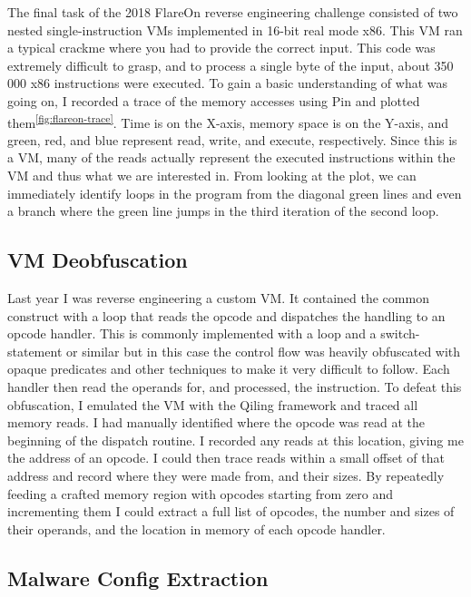 \documentclass[twocolumn]{article}
\begin{document}
The final task of the 2018 FlareOn reverse engineering challenge consisted of two nested single-instruction VMs implemented in 16-bit real mode x86. This VM ran a typical crackme where you had to provide the correct input. This code was extremely difficult to grasp, and to process a single byte of the input, about 350 000 x86 instructions were executed. To gain a basic understanding of what was going on, I recorded a trace of the memory accesses using Pin and plotted them\textsuperscript{\ref{fig:flareon-trace}}. Time is on the X-axis, memory space is on the Y-axis, and green, red, and blue represent read, write, and execute, respectively. Since this is a VM, many of the reads actually represent the executed instructions within the VM and thus what we are interested in. From looking at the plot, we can immediately identify loops in the program from the diagonal green lines and even a branch where the green line jumps in the third iteration of the second loop.

\vspace*{-0.5\baselineskip}
\subsection*{VM Deobfuscation}

Last year I was reverse engineering a custom VM. It contained the common construct with a loop that reads the opcode and dispatches the handling to an opcode handler. This is commonly implemented with a loop and a switch-statement or similar but in this case the control flow was heavily obfuscated with opaque predicates and other techniques to make it very difficult to follow. Each handler then read the operands for, and processed, the instruction. To defeat this obfuscation, I emulated the VM with the Qiling framework and traced all memory reads. I had manually identified where the opcode was read at the beginning of the dispatch routine. I recorded any reads at this location, giving me the address of an opcode. I could then trace reads within a small offset of that address and record where they were made from, and their sizes. By repeatedly feeding a crafted memory region with opcodes starting from zero and incrementing them I could extract a full list of opcodes, the number and sizes of their operands, and the location in memory of each opcode handler.

\vspace*{-0.5\baselineskip}
\subsection*{Malware Config Extraction}
\end{document}
